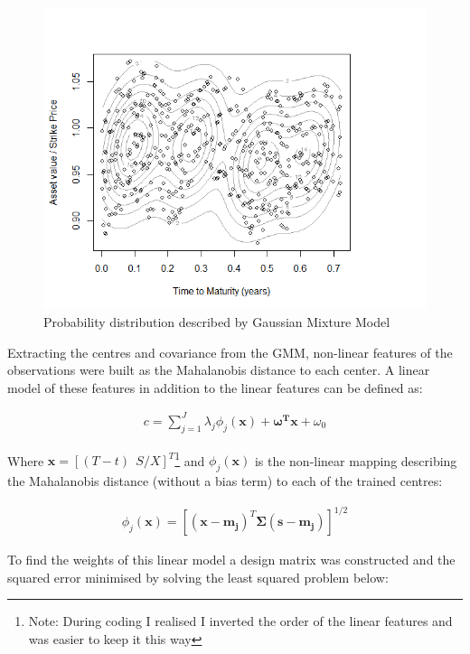 \documentclass{sig-alternate-05-2015}
\begin{document}
\begin{figure}[h]
	\includegraphics[width=\linewidth]{RBF.png}
	\centering
	\caption{Probability distribution described by Gaussian Mixture Model}
			\label{fig:RBF}
\end{figure} 

Extracting the centres and covariance from the GMM, non-linear features of the observations were built as the Mahalanobis distance to each center. A linear model of these features in addition to the linear features can be defined as:

\begin{align}
c = \sum^J_{j=1}\lambda_j\phi_j(\mathbf{x}) + \mathbf{\omega^Tx} + \omega_0 \label{eq:1}
\end{align}

Where $\mathbf{x} = [(T-t)\ \ S/X]^T$\footnote{Note: During coding I realised I inverted the order of the linear features and was easier to keep it this way} and $\phi_j(\mathbf{x})$ is the non-linear mapping describing the Mahalanobis distance (without a bias term) to each of the trained centres:

\begin{align}
\phi_j(\mathbf{x}) = \left[(\mathbf{x - m_j})^T \mathbf{\Sigma} (\mathbf{s - m_j})\right]^{1/2} 
\end{align}

To find the weights of this linear model a design matrix was constructed and the squared error minimised by solving the least squared problem below:
\end{document}
